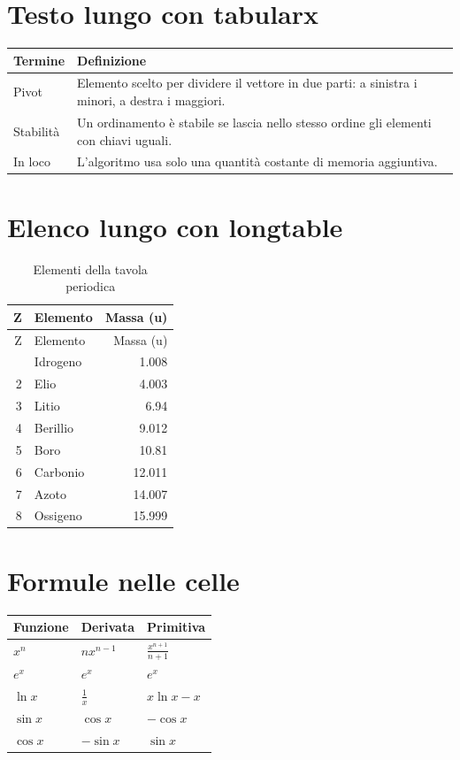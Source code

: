 \documentclass{article}
\begin{document}
\section*{Testo lungo con tabularx}

\begin{tabularx}{\textwidth}{@{}lX@{}}
  \toprule
  Termine & Definizione \\
  \midrule
  Pivot & Elemento scelto per dividere il vettore in due parti: a sinistra i minori, a destra i maggiori. \\
  Stabilità & Un ordinamento è stabile se lascia nello stesso ordine gli elementi con chiavi uguali. \\
  In loco & L'algoritmo usa solo una quantità costante di memoria aggiuntiva. \\
  \bottomrule
\end{tabularx}

\section*{Elenco lungo con longtable}

\begin{longtable}{@{}rlr@{}}
  \caption{Elementi della tavola periodica}\label{tab:elementi} \\
  \toprule
  Z & Elemento & Massa (u) \\
  \midrule
  \endfirsthead
  \toprule
  Z & Elemento & Massa (u) \\
  \midrule
  \endhead
  \bottomrule
  \endfoot
  1 & Idrogeno & 1.008 \\
  2 & Elio & 4.003 \\
  3 & Litio & 6.94 \\
  4 & Berillio & 9.012 \\
  5 & Boro & 10.81 \\
  6 & Carbonio & 12.011 \\
  7 & Azoto & 14.007 \\
  8 & Ossigeno & 15.999 \\
\end{longtable}

\section*{Formule nelle celle}

\begin{tabular}{@{}lll@{}}
  \toprule
  Funzione & Derivata & Primitiva \\
  \midrule
  $x^n$ & $n x^{n-1}$ & $\frac{x^{n+1}}{n+1}$ \\
  $e^x$ & $e^x$ & $e^x$ \\
  $\ln x$ & $\frac{1}{x}$ & $x \ln x - x$ \\
  $\sin x$ & $\cos x$ & $-\cos x$ \\
  $\cos x$ & $-\sin x$ & $\sin x$ \\
  \bottomrule
\end{tabular}
\end{document}
